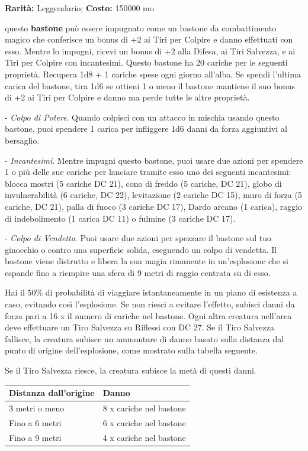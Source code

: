 \begin{multicols}{2}
\textbf{Rarità:} Leggendario; \textbf{Costo:} 150000 mo

questo \textbf{bastone} può essere impugnato come un bastone da combattimento magico che conferisce un bonus di +2 ai Tiri per Colpire e danno effettuati con esso. Mentre lo impugni, ricevi un bonus di +2 alla Difesa, ai Tiri Salvezza, e ai Tiri per Colpire con incantesimi. Questo bastone ha 20 cariche per le seguenti proprietà. Recupera 1d8 + 1 cariche spese ogni giorno all'alba. Se spendi l'ultima carica del bastone, tira 1d6 se ottieni 1 o meno il bastone mantiene il suo bonus di +2 ai Tiri per Colpire e danno ma perde tutte le altre proprietà.

- \emph{Colpo di Potere}. Quando colpisci con un attacco in mischia usando questo bastone, puoi spendere 1 carica per infliggere 1d6 danni da forza aggiuntivi al bersaglio.

- \emph{Incantesimi}. Mentre impugni questo bastone, puoi usare due azioni per spendere 1 o più delle sue cariche per lanciare tramite esso uno dei seguenti incantesimi: blocca mostri (5 cariche DC 21), cono di freddo (5 cariche, DC 21), globo di invulnerabilità (6 cariche, DC 22), levitazione (2 cariche DC 15), muro di forza (5 cariche, DC 21), palla di fuoco (3 cariche DC 17), Dardo arcano (1 carica), raggio di indebolimento (1 carica DC 11) o fulmine (3 cariche DC 17).

- \emph{Colpo di Vendetta}. Puoi usare due azioni per spezzare il bastone sul tuo ginocchio o contro una superficie solida, eseguendo un colpo di vendetta. Il bastone viene distrutto e libera la sua magia rimanente in un'esplosione che si espande fino a riempire una sfera di 9 metri di raggio centrata su di esso.

Hai il 50\% di probabilità di viaggiare istantaneamente in un piano di esistenza a caso, evitando così l'esplosione. Se non riesci a evitare l'effetto, subisci danni da forza pari a 16 x il numero di cariche nel bastone. Ogni altra creatura nell'area deve effettuare un Tiro Salvezza su Riflessi con DC 27. Se il Tiro Salvezza fallisce, la creatura subisce un ammontare di danno basato sulla distanza dal punto di origine dell'esplosione, come mostrato sulla tabella seguente.

Se il Tiro Salvezza riesce, la creatura subisce la metà di questi danni.

\medskip

\noindent\begin{tabularx}{0.49\textwidth}{Xl}
	\toprule
\textbf{Distanza dall'origine} &\textbf{Danno}\\
\toprule
3 metri o meno &8 x cariche nel bastone\\
Fino a 6 metri& 6 x cariche nel bastone\\
Fino a 9 metri& 4 x cariche nel bastone
\end{tabularx}


\end{multicols}
